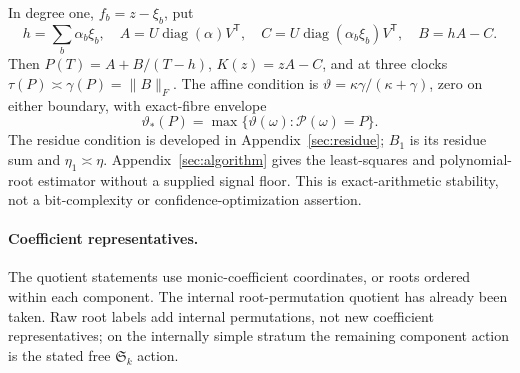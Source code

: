 \documentclass[11pt,reqno]{amsart}
\numberwithin{equation}{section}
\theoremstyle{definition}\newtheorem{definition}[theorem]{Definition}
\theoremstyle{remark}\newtheorem{remark}[theorem]{Remark}
\newcommand{\diag}{\operatorname{diag}}
\newcommand{\sig}{\vartheta}
\begin{document}
In degree one, $f_b=z-\xi_b$, put
\begin{equation}\label{eq:affine}
 h=\sum_b\alpha_b\xi_b,\quad
 A=U\diag(\alpha)V^{\mathsf T},\quad
 C=U\diag(\alpha_b\xi_b)V^{\mathsf T},\quad B=hA-C.
\end{equation}
Then $P(T)=A+B/(T-h)$, $K(z)=zA-C$, and at three clocks
$\tau(P)\asymp\gamma(P)=\|B\|_F$.
The affine condition is $\sig=\kappa\gamma/(\kappa+\gamma)$,
zero on either boundary, with exact-fibre envelope
\begin{equation}\label{eq:envelope}
 \sig_*(P)=\max\{\sig(\omega):\mathcal P(\omega)=P\}.
\end{equation}
The residue condition is developed in Appendix~\ref{sec:residue};
$B_1$ is its residue sum and $\eta_1\asymp\eta$.
Appendix~\ref{sec:algorithm} gives the least-squares and polynomial-root
estimator without a supplied signal floor. This is exact-arithmetic
stability, not a bit-complexity or confidence-optimization assertion.





\appendix




\paragraph{Coefficient representatives.}
The quotient statements use monic-coefficient coordinates, or roots
ordered within each component. The internal root-permutation quotient
has already been taken. Raw root labels add internal permutations,
not new coefficient representatives; on the internally simple
stratum the remaining component action is the stated free
$\mathfrak S_k$ action.


















\end{document}
